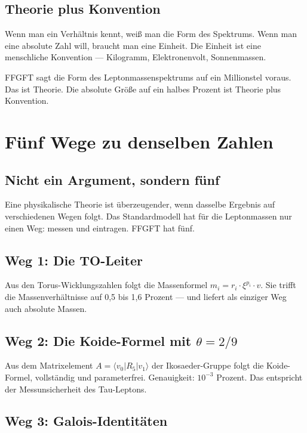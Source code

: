 \documentclass[12pt,oneside]{book}
\begin{document}
\section{Theorie plus Konvention}

Wenn man ein Verhältnis kennt, weiß man die Form des Spektrums. Wenn man eine absolute Zahl will, braucht man eine Einheit. Die Einheit ist eine menschliche Konvention — Kilogramm, Elektronenvolt, Sonnenmassen.

FFGFT sagt die Form des Leptonmassenspektrums auf ein Millionstel voraus. Das ist Theorie. Die absolute Größe auf ein halbes Prozent ist Theorie plus Konvention.

\chapter{Fünf Wege zu denselben Zahlen}

\section{Nicht ein Argument, sondern fünf}

Eine physikalische Theorie ist überzeugender, wenn dasselbe Ergebnis auf verschiedenen Wegen folgt. Das Standardmodell hat für die Leptonmassen nur einen Weg: messen und eintragen. FFGFT hat fünf.

\section{Weg 1: Die TO-Leiter}

Aus den Torus-Wicklungszahlen folgt die Massenformel $m_i = r_i \cdot \xi^{p_i} \cdot v$. Sie trifft die Massenverhältnisse auf 0,5 bis 1,6 Prozent — und liefert als einziger Weg auch absolute Massen.

\section{Weg 2: Die Koide-Formel mit $\theta = 2/9$}

Aus dem Matrixelement $A = \langle v_0 | R_5 | v_1 \rangle$ der Ikosaeder-Gruppe folgt die Koide-Formel, vollständig und parameterfrei. Genauigkeit: $10^{-3}$ Prozent. Das entspricht der Messunsicherheit des Tau-Leptons.

\section{Weg 3: Galois-Identitäten}
\end{document}
